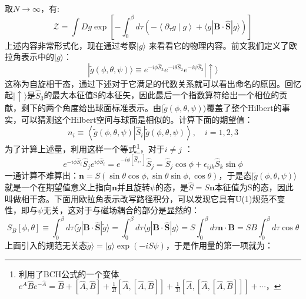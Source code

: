 \documentclass[10pt,openany]{book}
\theoremstyle{thmstyle} %
\theoremstyle{defstyle} %
\theoremstyle{prostyle} %
\begin{document}
取$ N\to\infty $，有:
\begin{equation}
	\mathcal{Z}=\int D g \exp \left[-\int_0^\beta d \tau\left(-\left\langle\partial_\tau g \mid g\right\rangle+\langle g|\mathbf{B} \cdot \hat{\mathbf{S}}| g\rangle\right)\right]
\end{equation}
上述内容非常形式化，现在通过考察$ |g\rangle $ 来看看它的物理内容。前文我们定义了欧拉角表示中的$ |g\rangle $：
\begin{equation}
	|\widetilde{g}(\phi, \theta, \psi)\rangle \equiv e^{-i \phi \hat{S}_3} e^{-i \theta \hat{S}_2} e^{-i \psi \hat{S}_3}|\uparrow\rangle
\end{equation} 
这称为自旋相干态，通过下述对于它满足的代数关系就可以看出命名的原因。回忆起$ |\uparrow\rangle $是$ \hat{S}_3 $的最大本征值S的本征矢，因此最后一个指数算符给出一个相位的贡献，剩下的两个角度给出球面标准表示。由$ |\widetilde{g}(\phi, \theta, \psi)\rangle $覆盖了整个Hilbert的事实，可以猜测这个Hilbert空间与球面是相似的。计算下面的期望值：
\begin{equation}
	n_i \equiv\left\langle\tilde{g}(\phi, \theta, \psi)\left|\hat{S}_i\right| \tilde{g}(\phi, \theta, \psi)\right\rangle, \quad i=1,2,3
	\label{expectationofs}
\end{equation}
为了计算上述量，利用这样一个等式\footnote{利用了BCH公式的一个变体$ e^{\hat{A}} \hat{B} e^{-\hat{A}}=\hat{B}+[\hat{A}, \hat{B}]+\frac{1}{2 !}[\hat{A},[\hat{A}, \hat{B}]]+\frac{1}{3 !}[\hat{A},[\hat{A},[\hat{A}, \hat{B}]]]+\cdots $， }，对于$ i \neq j$ ：
\begin{equation}
	e^{-i \phi \hat{S}_i} \hat{S}_j e^{i \phi \hat{S}_i}=e^{-i \phi\left[\hat{S}_i,\right]} \hat{S}_j=\hat{S}_j \cos \phi+\epsilon_{i j k} \hat{S}_k \sin \phi
\end{equation}
一通计算不难算出：$ \mathbf{n}=S(\sin \theta \cos \phi, \sin \theta \sin \phi, \cos \theta) $，于是态$ |\widetilde{g}(\phi, \theta, \psi)\rangle $就是一个在期望值意义上指向$ \mathbf{n} $并且旋转$ \psi $的态，是$ \hat{S}=S\mathbf{n}$本征值为S的态，因此叫做相干态。下面用欧拉角表示改写路径积分，可以发现它具有U(1)规范不变性，即与$ \psi $无关，这对于与磁场耦合的部分是显然的：
\begin{equation}
	S_B[\phi, \theta] \equiv \int_0^\beta d \tau\langle\tilde{g}|\mathbf{B} \cdot \hat{\mathbf{S}}| \tilde{g}\rangle=\int_0^\beta d \tau\langle g|\mathbf{B} \cdot \hat{\mathbf{S}}| g\rangle=S \int_0^\beta d \tau \mathbf{n} \cdot \mathbf{B}=S B \int_0^\beta d \tau \cos \theta
\end{equation} 
上面引入的规范无关态$ \tilde{g}\rangle=|g\rangle \exp (-i S \psi) $，于是作用量的第一项就为：
\end{document}
